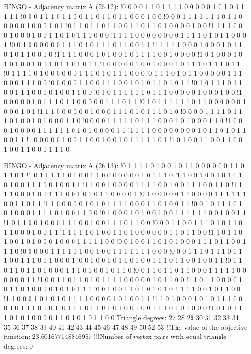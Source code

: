 BINGO - Adjacency matrix A (25,12):
!0 0 0 0 1 1 0 1 1 1 1 0 0 0 0 0 1 0 1 0 0 1 1 1 1
!0 0 0 1 1 1 0 1 1 0 0 1 1 0 1 1 0 1 1 0 0 0 1 0 0
!0 0 0 1 1 1 1 1 1 1 0 1 1 0 0 0 0 0 1 0 0 0 1 0 1
!0 1 1 0 1 1 0 1 1 0 0 1 1 0 1 1 0 1 0 0 0 0 1 0 0
!1 1 1 1 0 0 0 1 0 0 0 1 0 0 1 1 0 1 0 1 1 1 0 0 0
!1 1 1 1 0 0 0 0 0 0 0 0 1 1 1 1 0 1 0 1 1 0 0 0 1
!0 0 1 0 0 0 0 0 0 1 1 1 0 1 0 1 1 1 0 1 1 0 0 1 1
!1 1 1 1 1 0 0 0 1 0 0 0 1 0 1 1 0 1 0 1 1 0 0 0 0
!1 1 1 1 0 0 0 1 0 1 0 0 1 0 1 1 1 1 0 0 1 0 0 0 0
!1 0 1 0 0 0 1 0 1 0 1 0 0 1 0 0 1 0 1 1 0 1 0 1 1
!1 0 0 0 0 0 1 0 0 1 0 0 0 1 0 1 1 1 0 1 1 1 0 1 1
!0 1 1 1 1 0 1 0 0 0 0 0 0 1 1 1 0 1 0 1 1 1 0 0 0
!0 1 1 1 0 1 0 1 1 0 0 0 0 0 1 1 1 0 0 0 1 1 1 0 0
!0 0 0 0 0 1 1 0 0 1 1 1 0 0 1 0 1 0 1 1 0 1 0 1 1
!0 1 0 1 1 1 0 1 1 0 0 1 1 1 0 0 0 0 1 0 0 1 1 0 0
!0 1 0 1 1 1 1 1 1 0 1 1 1 0 0 0 0 0 1 0 0 0 1 0 0
!1 0 0 0 0 0 1 0 1 1 1 0 1 1 0 0 0 0 0 1 1 1 0 1 1
!0 1 0 1 1 1 1 1 1 0 1 1 0 0 0 0 0 0 1 0 0 0 1 0 1
!1 1 1 0 0 0 0 0 0 1 0 0 0 1 1 1 0 1 0 1 1 1 0 1 0
!0 0 0 0 1 1 1 1 0 1 1 1 0 1 0 0 1 0 1 0 0 0 1 1 0
!0 0 0 0 1 1 1 1 1 0 1 1 1 0 0 0 1 0 1 0 0 0 1 1 0
!1 0 0 0 1 0 0 0 0 1 1 1 1 1 1 0 1 0 1 0 0 0 0 1 1
!1 1 1 1 0 0 0 0 0 0 0 0 1 0 1 1 0 1 0 1 1 0 0 1 1
!1 0 0 0 0 0 1 0 0 1 1 0 0 1 0 0 1 0 1 1 1 1 1 0 1
!1 0 1 0 0 1 1 0 0 1 1 0 0 1 0 0 1 1 0 0 0 1 1 1 0


BINGO - Adjacency matrix A (26,13):
!0 1 1 1 1 0 1 0 0 1 0 1 1 0 0 0 0 0 0 1 1 0 1 1 0 1
!1 0 1 1 1 1 1 0 1 0 0 1 1 0 0 0 0 0 0 0 1 0 1 1 1 0
!1 1 0 0 1 0 0 1 0 1 0 1 0 1 0 0 1 1 1 0 0 1 0 0 1 1
!1 1 0 0 1 0 0 0 0 1 1 1 1 0 0 1 0 0 1 1 1 0 0 1 1 0
!1 1 1 1 0 0 0 1 0 0 1 1 1 0 0 1 0 1 0 1 1 0 0 0 0 1
!0 1 0 0 0 0 0 1 1 0 0 0 0 1 1 1 1 1 1 0 0 1 1 0 1 1
!1 1 0 0 0 0 0 1 0 1 0 1 1 1 1 0 0 0 1 1 0 1 0 0 1 1
!0 0 1 0 1 1 1 0 1 0 1 0 0 0 1 1 1 1 0 1 0 0 1 1 0 0
!0 1 0 0 0 1 0 1 0 0 1 0 0 1 1 1 1 1 1 0 0 1 0 0 1 1
!1 0 1 1 0 0 1 0 0 0 1 1 1 0 0 1 0 0 1 1 1 0 1 1 0 0
!0 0 0 1 1 0 0 1 1 1 0 1 0 1 1 0 1 1 0 0 0 1 0 0 1 1
!1 1 1 1 1 0 1 0 0 1 1 0 1 0 0 0 0 0 0 1 1 0 1 1 0 0
!1 1 0 1 1 0 1 0 0 1 0 1 0 0 0 1 0 0 0 1 1 1 1 1 0 0
!0 0 1 0 0 1 1 0 1 0 1 0 0 0 1 1 1 0 1 1 0 0 1 1 1 0
!0 0 0 0 0 1 1 1 1 0 1 0 0 1 0 0 1 1 1 1 1 1 1 0 0 0
!0 0 0 1 1 1 0 1 1 1 0 0 1 1 0 0 1 1 1 0 0 1 0 0 0 1
!0 0 1 0 0 1 0 1 1 0 1 0 0 1 1 1 0 1 1 0 0 1 0 0 1 1
!0 0 1 0 1 1 0 1 1 0 1 0 0 0 1 1 1 0 1 0 0 1 0 1 1 0
!0 0 1 1 0 1 1 0 1 1 0 0 0 1 1 1 1 1 0 0 0 0 0 0 1 1
!1 0 0 1 1 0 1 1 0 1 0 1 1 1 1 0 0 0 0 0 1 0 1 1 0 0
!1 1 0 1 1 0 0 0 0 1 0 1 1 0 1 0 0 0 0 1 0 1 0 1 1 1
!0 0 1 0 0 1 1 0 1 0 1 0 1 0 1 1 1 1 0 0 1 0 1 1 0 0
!1 1 0 0 0 1 0 1 0 1 0 1 1 1 1 0 0 0 0 1 0 1 0 0 1 1
!1 1 0 1 0 0 0 1 0 1 0 1 1 1 0 0 0 1 0 1 1 1 0 0 0 1
!0 1 1 1 0 1 1 0 1 0 1 0 0 1 0 0 1 1 1 0 1 0 1 0 0 0
!1 0 1 0 1 1 1 0 1 0 1 0 0 0 0 1 1 0 1 0 1 0 1 1 0 0
Triangle degrees:
27 28 29 30 31 32 33 34 35 36 37 38 39 40 41 42 43 44 45 46 47 48 49 50 52 53
!!The value of the objective function: 23.601677148846957
!!!Number of vertex pairs with equal triangle degrees: 0


